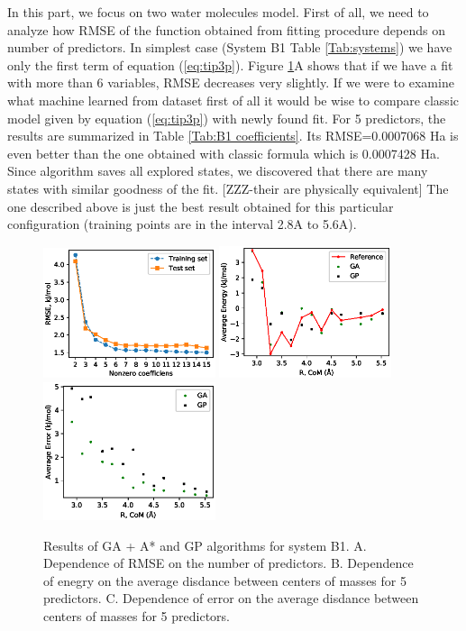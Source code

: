 \documentclass[aip,jcp,reprint,amsmath,amssymb,nature]{revtex4-1}
\begin{document}
In this part, we focus on two water molecules model. First of all, we need to analyze how RMSE of the function obtained from fitting procedure depends on number of predictors. In simplest case (System B1 Table \ref{Tab:systems}) we have only the first term of equation (\ref{eq:tip3p}). Figure \ref{Fig:B1}A shows that if we have a fit with more than 6 variables, RMSE decreases very slightly. If we were to examine what machine learned from dataset first of all it would be wise to compare classic model given by equation (\ref{eq:tip3p}) with newly found fit. For 5 predictors, the results are summarized in Table \ref{Tab:B1 coefficients}. Its RMSE=0.0007068 Ha is even better than the one obtained with classic formula which is 0.0007428 Ha. Since algorithm saves all explored states, we discovered that there are many states with similar goodness of the fit. [ZZZ-their are physically equivalent] The one described above is just the best result obtained for this particular configuration (training points are in the interval 2.8A to 5.6A).

\begin{figure}
\includegraphics[width=0.45\textwidth]{media/B1_Single_GA_PATH_RMSE.eps}
\includegraphics[width=0.45\textwidth]{media/B1_Single_Energy_5_predictors.eps}
\includegraphics[width=0.45\textwidth]{media/B1_Single_Error_5_predictors.eps}
\caption{Results of GA + A* and GP algorithms for system B1.  A. Dependence of RMSE on the number of predictors. B. Dependence of enegry on the average disdance between centers of masses for 5 predictors. C. Dependence of error on the average disdance between centers of masses for 5 predictors.}\label{Fig:B1}
\end{figure}
\end{document}
